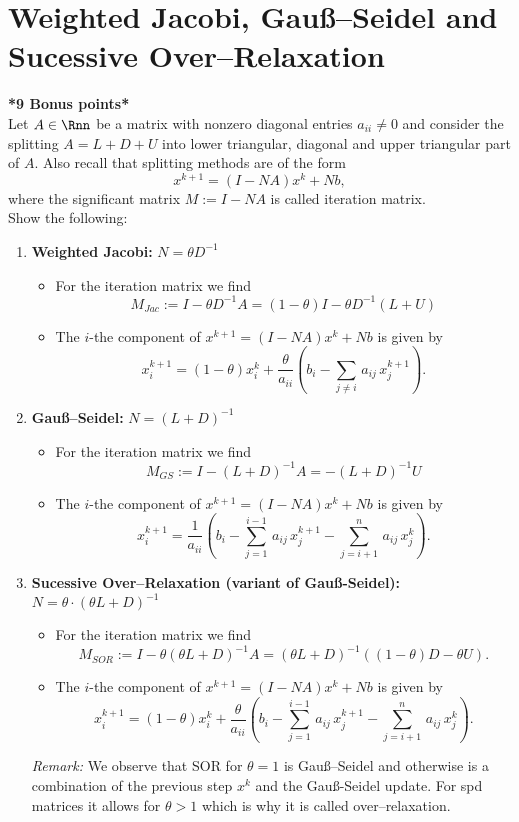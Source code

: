 \section{Weighted Jacobi, Gauß--Seidel and Sucessive Over--Relaxation}
\textbf{\color{solution}*9 Bonus points*}\\Let $A\in \Rnn$ be a matrix with nonzero diagonal entries $a_{ii}\neq 0$ and consider the splitting $A=L+D+U$ into lower triangular, diagonal and upper triangular part of $A$. Also recall that splitting methods are of the form
$$x^{k+1} = (I-NA)x^k + Nb, $$
where the significant matrix $M:=I-NA$ is called iteration matrix.\\

Show the following:
\begin{enumerate}
	\item \textbf{Weighted Jacobi:} $N=\theta D^{-1}$
	\begin{itemize}
		\item For the iteration matrix we find
		$$M_{Jac} := I-\theta D^{-1}A = (1-\theta)I - \theta D^{-1}(L+U) $$
		\item The $i$-the component of $x^{k+1}=(I-NA)x^k + Nb$ is given by
		$$x^{k+1}_i = (1-\theta)x_i^k +  \frac{\theta}{a_{ii}}\left( b_i - \sum_{j\neq i} \,a_{ij} \, x_j^{k+1}\right).$$
	\end{itemize} 
	\item \textbf{Gauß--Seidel:} $N=(L+D)^{-1}$
		\begin{itemize}
		\item For the iteration matrix we find
		$$M_{GS} := I- (L+D)^{-1}A =-(L+D)^{-1}U$$
		\item The $i$-the component of $x^{k+1}=(I-NA)x^k + Nb$ is given by
		$$x^{k+1}_i =  \frac{1}{a_{ii}}\left( b_i - \sum\limits^{i-1}_{j=1} \,a_{ij} \, x_j^{k+1} -  \sum\limits^n_{j = i+1} \, a_{ij} \, x^k_j  \right).$$
	\end{itemize} 
	\item \textbf{Sucessive Over--Relaxation (variant of Gauß-Seidel):}  $N=\theta\cdot(\theta L+D)^{-1}$
		\begin{itemize}
	\item For the iteration matrix we find
	$$M_{SOR} :=I-\theta( \theta L+D )^{-1}A=(\theta L +D)^{-1} ((1-\theta)D-\theta U).$$
		\item  The $i$-the component of $x^{k+1}=(I-NA)x^k + Nb$ is given by
	$$ x^{k+1}_i = (1-\theta)x_i^k+   \frac{\theta}{a_{ii}}\left( b_i - \sum\limits^{i-1}_{j=1} \,a_{ij} \, x_j^{k+1} -  \sum\limits^n_{j = i+1} \, a_{ij} \, x^k_j  \right).$$
	\end{itemize}
{\color{navy}\textit{Remark:} We observe that SOR for $\theta = 1$ is Gauß--Seidel and otherwise is a combination of the previous step $x^k$ and the Gauß-Seidel update. For spd matrices it allows for $\theta > 1$ which is why it is called over--relaxation.}
\end{enumerate}
